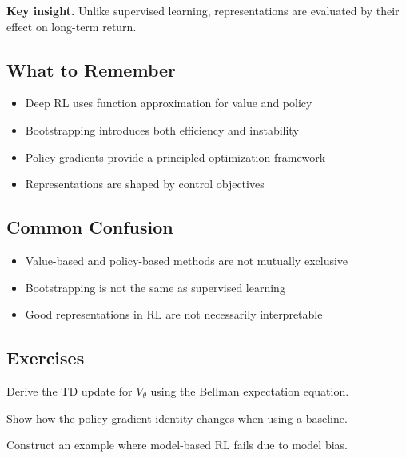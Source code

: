 \medskip

\noindent
\textbf{Key insight.}  
Unlike supervised learning, representations are evaluated by their effect on long-term return.

\subsection{What to Remember}

\begin{itemize}
\item Deep RL uses function approximation for value and policy
\item Bootstrapping introduces both efficiency and instability
\item Policy gradients provide a principled optimization framework
\item Representations are shaped by control objectives
\end{itemize}

\subsection{Common Confusion}

\begin{itemize}
\item Value-based and policy-based methods are not mutually exclusive
\item Bootstrapping is not the same as supervised learning
\item Good representations in RL are not necessarily interpretable
\end{itemize}

\subsection{Exercises}

\begin{exercise}
Derive the TD update for $V_\theta$ using the Bellman expectation equation.
\end{exercise}

\begin{exercise}
Show how the policy gradient identity changes when using a baseline.
\end{exercise}

\begin{exercise}
Construct an example where model-based RL fails due to model bias.
\end{exercise}

